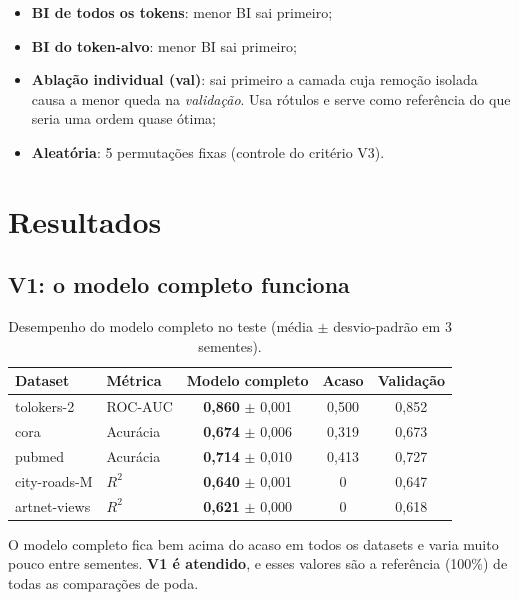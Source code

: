 \documentclass[11pt,a4paper]{article}
\newcommand{\bom}[1]{\textbf{#1}}
\begin{document}
\begin{itemize}
  \item \textbf{BI de todos os tokens}: menor BI sai primeiro;
  \item \textbf{BI do token-alvo}: menor BI sai primeiro;
  \item \textbf{Ablação individual (val)}: sai primeiro a camada cuja remoção isolada causa a menor queda na \emph{validação}. Usa rótulos e serve como referência do que seria uma ordem quase ótima;
  \item \textbf{Aleatória}: 5 permutações fixas (controle do critério V3).
\end{itemize}

\section{Resultados}

\subsection{V1: o modelo completo funciona}

\begin{table}[H]
\centering
\caption{Desempenho do modelo completo no teste (média $\pm$ desvio-padrão em 3 sementes).}
\label{tab:baseline}
\begin{tabular}{@{}llccc@{}}
\toprule
Dataset & Métrica & Modelo completo & Acaso & Validação \\
\midrule
tolokers-2   & ROC-AUC  & \bom{0,860} $\pm$ 0,001 & 0,500 & 0,852 \\
cora         & Acurácia & \bom{0,674} $\pm$ 0,006 & 0,319 & 0,673 \\
pubmed       & Acurácia & \bom{0,714} $\pm$ 0,010 & 0,413 & 0,727 \\
city-roads-M & $R^2$    & \bom{0,640} $\pm$ 0,001 & 0     & 0,647 \\
artnet-views & $R^2$    & \bom{0,621} $\pm$ 0,000 & 0     & 0,618 \\
\bottomrule
\end{tabular}
\end{table}

O modelo completo fica bem acima do acaso em todos os datasets e varia muito pouco entre sementes. \textbf{V1 é atendido}, e esses valores são a referência (100\%) de todas as comparações de poda.
\end{document}
